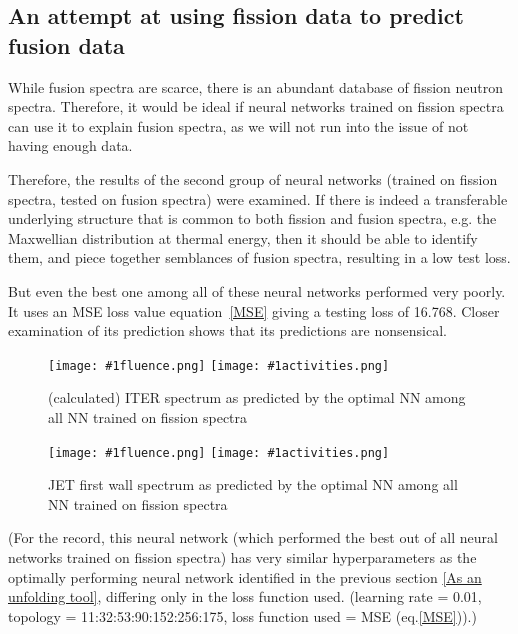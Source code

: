 \documentclass[a4paper, 12pt]{article}
\newcommand{\fluenceandactivities}[1]{
\texttt{[image: \#1fluence.png]}
\texttt{[image: \#1activities.png]}
}
\begin{document}
\subsection{An attempt at using fission data to predict fusion data}
    While fusion spectra are scarce, there is an abundant database of fission neutron spectra. Therefore, it would be ideal if neural networks trained on fission spectra can use it to explain fusion spectra, as we will not run into the issue of not having enough data.

    Therefore, the results of the second group of neural networks (trained on fission spectra, tested on fusion spectra) were examined. If there is indeed a transferable underlying structure that is common to both fission and fusion spectra, e.g. the Maxwellian distribution at thermal energy, then it should be able to identify them, and piece together semblances of fusion spectra, resulting in a low test loss.

    But even the best one among all of these neural networks performed very poorly. It uses an MSE loss value equation~\ref{MSE} giving a testing loss of 16.768. Closer examination of its prediction shows that its predictions are nonsensical.

\begin{figure}[H]
\centering
\fluenceandactivities{/home/ocean/Documents/GitHubDir/unfolding/unfolding/unfoldingsuite/neuralnetwork/realoutputEarlyStopping/SelectedNNreplicated/fission-fusion/0927_0226_5_layer_test_mse_1_test_007_}
\caption{(calculated) ITER spectrum as predicted by the optimal NN among all NN trained on fission spectra} \label{fission-fusionBad}
\end{figure}

\begin{figure}[H]
\centering
\fluenceandactivities{/home/ocean/Documents/GitHubDir/unfolding/unfolding/unfoldingsuite/neuralnetwork/realoutputEarlyStopping/SelectedNNreplicated/fission-fusion/0927_0226_5_layer_test_mse_1_test_016_}
\caption{JET first wall spectrum as predicted by the optimal NN among all NN trained on fission spectra}\label{fission-fusionGood}
\end{figure}

    (For the record, this neural network (which performed the best out of all neural networks trained on fission spectra) has very similar hyperparameters as the optimally performing neural network identified in the previous section \ref{As an unfolding tool}, differing only in the loss function used. (learning rate = 0.01, topology = 11:32:53:90:152:256:175, loss function used = MSE (eq.\ref{MSE})).)
\end{document}
